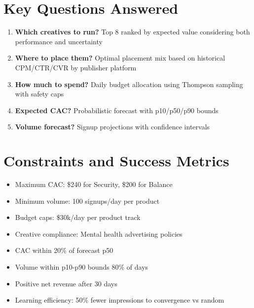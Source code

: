 \documentclass[11pt,a4paper]{report}
\begin{document}
\section{Key Questions Answered}

\begin{enumerate}
    \item \textbf{Which creatives to run?} Top 8 ranked by expected value considering both performance and uncertainty
    \item \textbf{Where to place them?} Optimal placement mix based on historical CPM/CTR/CVR by publisher platform
    \item \textbf{How much to spend?} Daily budget allocation using Thompson sampling with safety caps
    \item \textbf{Expected CAC?} Probabilistic forecast with p10/p50/p90 bounds
    \item \textbf{Volume forecast?} Signup projections with confidence intervals
\end{enumerate}

\section{Constraints and Success Metrics}

\begin{metricbox}
\begin{itemize}
    \item Maximum CAC: \$240 for Security, \$200 for Balance
    \item Minimum volume: 100 signups/day per product
    \item Budget caps: \$30k/day per product track
    \item Creative compliance: Mental health advertising policies
\end{itemize}
\end{metricbox}

\begin{metricbox}
\begin{itemize}
    \item CAC within 20\% of forecast p50
    \item Volume within p10-p90 bounds 80\% of days
    \item Positive net revenue after 30 days
    \item Learning efficiency: 50\% fewer impressions to convergence vs random
\end{itemize}
\end{metricbox}
\end{document}
